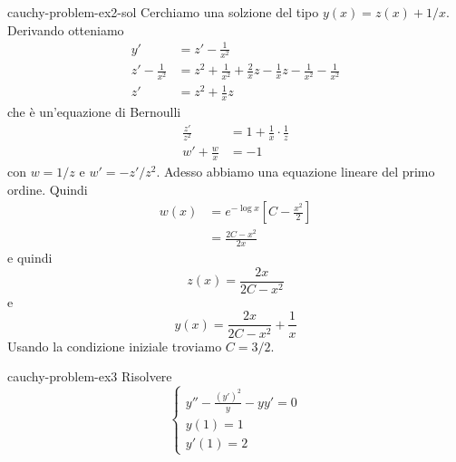 \documentclass[preview]{standalone}
\begin{document}
\begin{snippetsolution}{cauchy-problem-ex2-sol}{}
    Cerchiamo una solzione del tipo \(y(x) = z(x) + 1/x\).
    Derivando otteniamo
    \begin{align*}
        y' &= z' - \frac{1}{x^2} \\
        z' - \frac{1}{x^2} &= z^2 + \frac{1}{x^2} + \frac{2}{x}z - \frac{1}{x}z - \frac{1}{x^2} - \frac{1}{x^2} \\
        z' &= z^2 + \frac{1}{x}z
    \end{align*}
    che è un'equazione di Bernoulli
    \begin{align*}
        \frac{z'}{z^2} &= 1 + \frac{1}{x} \cdot \frac{1}{z} \\
        w' + \frac{w}{x} &= - 1
    \end{align*}
    con \(w = 1/z\) e \(w' = -z'/z^2\).
    Adesso abbiamo una equazione lineare del primo ordine.
    Quindi
    \begin{align*}
        w(x) &= e^{-\log x} \left[
            C- \frac{x^2}{2}
        \right] \\
        &= \frac{2C-x^2}{2x}
    \end{align*}
    e quindi
    \[
        z(x) = \frac{2x}{2C-x^2}
    \]
    e
    \[
        y(x) = \frac{2x}{2C - x^2} + \frac{1}{x}
    \]
    Usando la condizione iniziale troviamo \(C = 3/2\).
\end{snippetsolution}

\begin{snippetexercise}{cauchy-problem-ex3}{}
    Risolvere
    \[
        \begin{cases}
            y'' - \frac{{(y')}^2}{y} - yy' = 0 \\
            y(1) = 1 \\
            y'(1) = 2
        \end{cases}
    \]
\end{snippetexercise}
\end{document}
